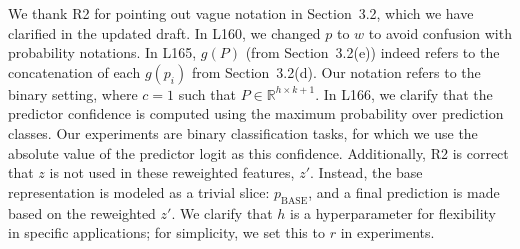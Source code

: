 \documentclass{article}
\begin{document}
We thank R2 for pointing out vague notation in Section~3.2, which we have clarified in the updated draft. 
In L160, we changed $p$ to $w$ to avoid confusion with probability notations.
In L165, $g(P)$ (from Section~3.2(e)) indeed refers to the concatenation of each $g(p_i)$ from Section~3.2(d).
Our notation refers to the binary setting, where $c=1$ such that $P \in \mathbb{R}^{h \times k + 1}$. 
In L166, we clarify that the predictor confidence is computed using the maximum probability over prediction classes.
Our experiments are binary classification tasks, for which we use the absolute value of the predictor logit as this confidence.
Additionally, R2 is correct that $z$ is not used in these reweighted features, $z'$. 
Instead, the base representation is modeled as a trivial slice: $p_{\text{BASE}}$, and a final prediction is made based on the reweighted $z'$.
We clarify that $h$ is a hyperparameter for flexibility in specific applications; for simplicity, we set this to $r$ in experiments. 




\end{document}

